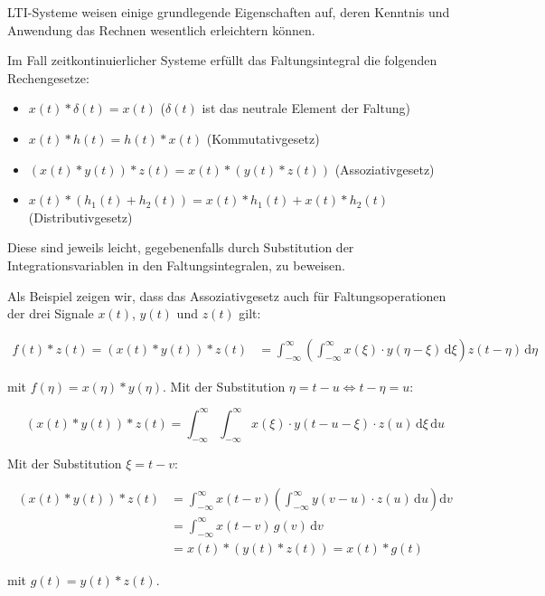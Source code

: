 LTI-Systeme weisen einige grundlegende Eigenschaften auf, deren Kenntnis und Anwendung das Rechnen wesentlich erleichtern können.

\begin{satz}
Im Fall zeitkontinuierlicher Systeme erfüllt das Faltungsintegral die folgenden Rechengesetze:

\begin{itemize}
  \item $x(t) * \delta(t) = x(t)$ ($\delta(t)$ ist das neutrale Element der Faltung)
  \item $x(t) * h(t) = h(t) * x(t)$ (Kommutativgesetz)
  \item $(x(t) * y(t)) * z(t) = x(t) * (y(t) * z(t))$ (Assoziativgesetz)
  \item $x(t) * (h_1(t) + h_2(t)) = x(t) * h_1(t) + x(t) * h_2(t)$ (Distributivgesetz)
\end{itemize}
\end{satz}

Diese sind jeweils leicht, gegebenenfalls durch Substitution der Integrationsvariablen in den Faltungsintegralen, zu beweisen.

\begin{beweis}
Als Beispiel zeigen wir, dass das Assoziativgesetz auch für Faltungsoperationen der drei Signale $x(t)$, $y(t)$ und $z(t)$ gilt:

\begin{align*}
f(t) * z(t) = (x(t) * y(t)) * z(t)
&= \int_{-\infty}^{\infty} \!\left(\int_{-\infty}^{\infty} x(\xi)\cdot y(\eta - \xi)\,\mathrm{d}\xi\right) z(t - \eta)\,\mathrm{d}\eta
\end{align*}

mit $f(\eta) = x(\eta) * y(\eta)$. Mit der Substitution $\eta = t - u \Leftrightarrow t - \eta = u$:

$$
(x(t) * y(t)) * z(t) = \int_{-\infty}^{\infty}\int_{-\infty}^{\infty} x(\xi)\cdot y(t - u - \xi)\cdot z(u)\,\mathrm{d}\xi\,\mathrm{d}u
$$

Mit der Substitution $\xi = t - v$:

\begin{align*}
(x(t) * y(t)) * z(t)
&= \int_{-\infty}^{\infty} x(t - v) \left(\int_{-\infty}^{\infty} y(v - u)\cdot z(u)\,\mathrm{d}u\right)\mathrm{d}v \\
&= \int_{-\infty}^{\infty} x(t - v)\,g(v)\,\mathrm{d}v \\
&= x(t) * (y(t) * z(t)) = x(t) * g(t)
\end{align*}

mit $g(t) = y(t) * z(t)$.
\end{beweis}

